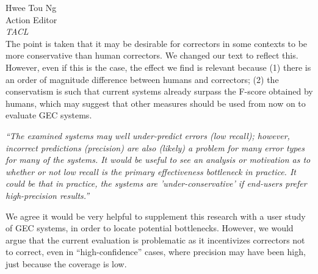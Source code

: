\documentclass[11pt,letterpaper]{letter}
\begin{document}
\begin{letter}{%
Hwee Tou Ng\\
Action Editor\\
{\em TACL}\\
}
The point is taken that it may be desirable for correctors in some contexts to be more conservative than human correctors. We changed our text to reflect this. However, even if this is the case, the effect we find is relevant because (1) there is an order of magnitude difference between humans and correctors; (2) the conservatism is such that current systems already surpass the F-score obtained by humans, which may suggest that other measures should be used from now on to evaluate GEC systems. %


\emph{``The examined systems may well under-predict errors (low recall); however,
	incorrect predictions (precision) are also (likely) a problem for many error
	types for many of the systems. It would be useful to see an analysis or
	motivation as to whether or not low recall is the primary effectiveness
	bottleneck in practice. It could be that in practice, the systems are
	'under-conservative' if end-users prefer high-precision results.''
	}

We agree it would be very helpful to supplement this research with a user study of GEC systems, in order to locate potential bottlenecks. However, we would argue that the current evaluation is problematic as it incentivizes correctors not to correct, even in ``high-confidence'' cases, where precision may have been high, just because the coverage is low. 


\end{letter}
\end{document}

